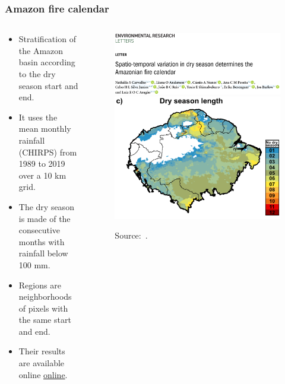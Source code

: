 \documentclass[aspectratio=169]{beamer}
\begin{document}
\begin{frame}
    \frametitle{Amazon fire calendar}
    \begin{columns}
        \begin{column}{0.5\linewidth}
            \begin{itemize}
                \item Stratification of the Amazon basin according to the dry
                    season start and \/end.
                \item It uses the mean monthly rainfall (CHIRPS) from 1989 to
                    2019 over a 10 km grid.
                \item The dry season is made of the consecutive months with 
                    rainfall below 100 mm.
                \item Regions are neighborhoods of pixels with the same start
                    and end.
                \item Their results are available online
                    \href{https://zenodo.org/records/5706455}{online}.
            \end{itemize}
        \end{column}
        \begin{column}{0.5\linewidth}
            \begin{figure}[h]
                \includegraphics[width=0.79\linewidth]
                {./images/carvalho2021.png}
                \includegraphics[width=0.69\linewidth]
                {./images/carvalho_fire_season_length.png}
                \caption{Source:~\cite{carvalho2021}.}
            \end{figure}
        \end{column}
    \end{columns}
\end{frame}
\end{document}
